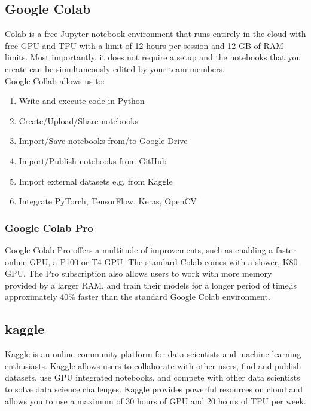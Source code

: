 \subsection{Google Colab}
Colab is a free Jupyter notebook environment that runs entirely in the cloud with free GPU and TPU with a limit of 12 hours
per session and 12 GB of RAM limits. Most importantly, it does not require a setup and the notebooks that you create can be simultaneously edited by your team members.\cite{w6}  \\
Google Collab allows us to:
\begin{enumerate}
    \item Write and execute code in Python
    \item Create/Upload/Share notebooks
    \item Import/Save notebooks from/to Google Drive
    \item Import/Publish notebooks from GitHub
    \item Import external datasets e.g. from Kaggle
    \item Integrate PyTorch, TensorFlow, Keras, OpenCV
\end{enumerate}
\subsubsection{Google Colab Pro}
\label{Google Colab Pro}
 Google Colab Pro offers a multitude of improvements, such as enabling a faster online GPU, a P100 or T4 GPU. The standard Colab comes with a slower, K80 GPU. The Pro subscription also allows users to work with more memory provided by a larger RAM, and train their models for a longer period of time,is approximately 40\% faster than the standard Google Colab environment.\cite{w8}
\subsection{kaggle}
Kaggle is an online community platform for data scientists and machine learning enthusiasts. Kaggle allows users to collaborate with other users, find and publish datasets, use GPU integrated notebooks, and compete with other data scientists to solve data science challenges.
Kaggle provides powerful resources on cloud and allows you to use a maximum of 30 hours of GPU and 20 hours of TPU per week. 
